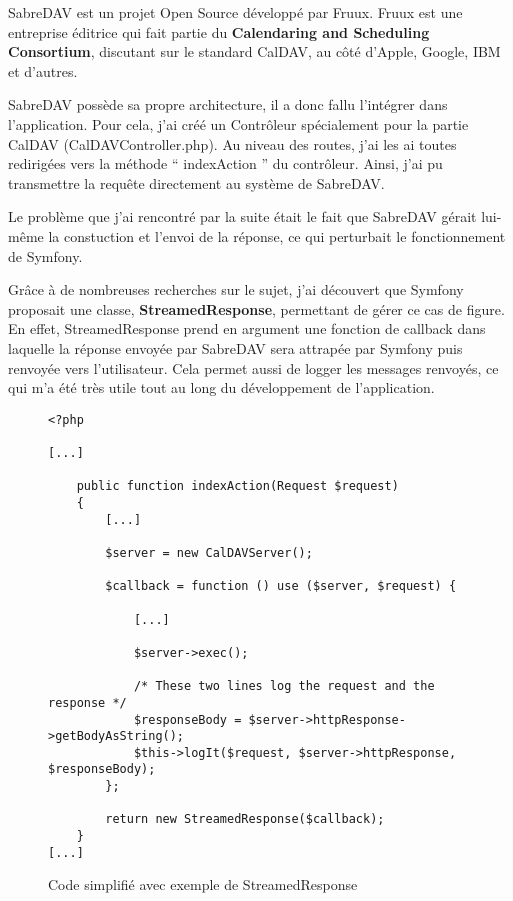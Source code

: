 SabreDAV est un projet Open Source développé par Fruux. Fruux est une entreprise éditrice qui fait partie du \textbf{Calendaring and Scheduling Consortium}, discutant sur le standard CalDAV, au côté d'Apple, Google, IBM et d'autres.

SabreDAV possède sa propre architecture, il a donc fallu l'intégrer dans l'application. Pour cela, j'ai créé un Contrôleur spécialement pour la partie CalDAV (CalDAVController.php). Au niveau des routes, j'ai les ai toutes redirigées vers la méthode `` indexAction '' du contrôleur. Ainsi, j'ai pu transmettre la requête directement au système de SabreDAV.

Le problème que j'ai rencontré par la suite était le fait que SabreDAV gérait lui-même la constuction et l'envoi de la réponse, ce qui perturbait le fonctionnement de Symfony.

Grâce à de nombreuses recherches sur le sujet, j'ai découvert que Symfony proposait une classe, \textbf{StreamedResponse}, permettant de gérer ce cas de figure. En effet, StreamedResponse prend en argument une fonction de callback dans laquelle la réponse envoyée par SabreDAV sera attrapée par Symfony puis renvoyée vers l'utilisateur. Cela permet aussi de logger les messages renvoyés, ce qui m'a été très utile tout au long du développement de l'application.

\begin{figure}[H]
\begin{lstlisting}[frame=single]
<?php

[...]

    public function indexAction(Request $request)
    {
        [...]

        $server = new CalDAVServer();

        $callback = function () use ($server, $request) {

            [...]

            $server->exec();

            /* These two lines log the request and the response */
            $responseBody = $server->httpResponse->getBodyAsString();
            $this->logIt($request, $server->httpResponse, $responseBody);
        };

        return new StreamedResponse($callback);
    }
[...]

\end{lstlisting}
\caption{Code simplifié avec exemple de StreamedResponse}
\end{figure}

